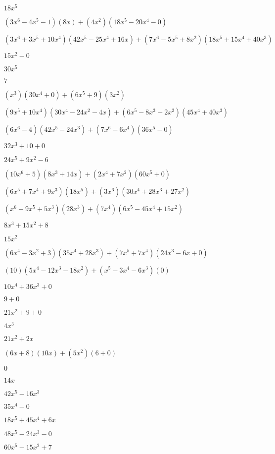 \documentclass{article}
\begin{document}
\begin{multicols}{2}
$18x^{5}$\item $(3x^{6}-4x^{5}-1)(8x)+(4x^2)(18x^{5}-20x^{4}-0)$\item $(3x^{6}+3x^{5}+10x^{4})(42x^{5}-25x^{4}+16x)+(7x^{6}-5x^{5}+8x^2)(18x^{5}+15x^{4}+40x^{3})$\item $15x^{2}-0$\item $30x^{5}$\item $7$\item $(x^{3})(30x^{4}+0)+(6x^{5}+9)(3x^{2})$\item $(9x^{5}+10x^{4})(30x^{4}-24x^{2}-4x)+(6x^{5}-8x^{3}-2x^2)(45x^{4}+40x^{3})$\item $(6x^{6}-4)(42x^{5}-24x^{3})+(7x^{6}-6x^{4})(36x^{5}-0)$\item $32x^{3}+10+0$\item $24x^{5}+9x^{2}-6$\item $(10x^{6}+5)(8x^{3}+14x)+(2x^{4}+7x^2)(60x^{5}+0)$\item $(6x^{5}+7x^{4}+9x^{3})(18x^{5})+(3x^{6})(30x^{4}+28x^{3}+27x^{2})$\item $(x^{6}-9x^{5}+5x^{3})(28x^{3})+(7x^{4})(6x^{5}-45x^{4}+15x^{2})$\item $8x^{3}+15x^{2}+8$\item $15x^{2}$\item $(6x^{4}-3x^2+3)(35x^{4}+28x^{3})+(7x^{5}+7x^{4})(24x^{3}-6x+0)$\item $(10)(5x^{4}-12x^{3}-18x^{2})+(x^{5}-3x^{4}-6x^{3})(0)$\item $10x^{4}+36x^{3}+0$\item $9+0$\item $21x^{2}+9+0$\item $4x^{3}$\item $21x^{2}+2x$\item $(6x+8)(10x)+(5x^2)(6+0)$\item $0$\item $14x$\item $42x^{5}-16x^{3}$\item $35x^{4}-0$\item $18x^{5}+45x^{4}+6x$\item $48x^{5}-24x^{3}-0$\item $60x^{5}-15x^{2}+7$\item 
\end{multicols}
\end{document}
